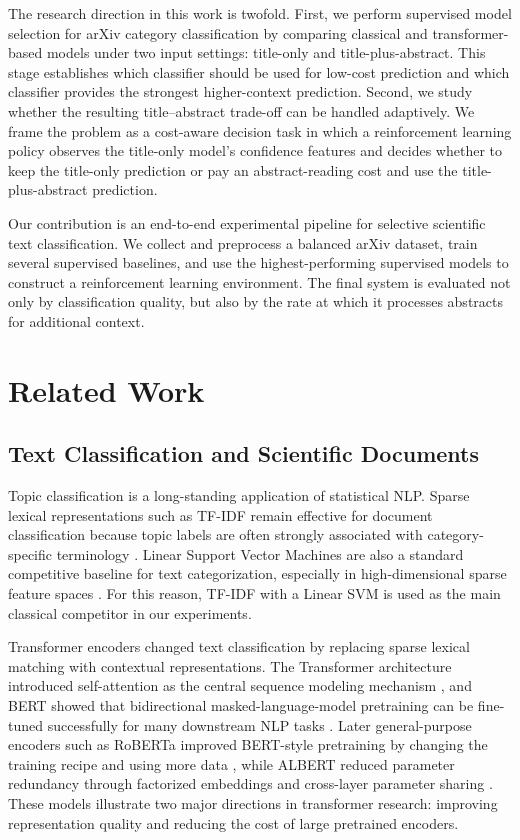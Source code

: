 \documentclass{article}
\begin{document}
The research direction in this work is twofold. First, we perform supervised model selection for arXiv category classification by comparing classical and transformer-based models under two input settings: title-only and title-plus-abstract. This stage establishes which classifier should be used for low-cost prediction and which classifier provides the strongest higher-context prediction. Second, we study whether the resulting title--abstract trade-off can be handled adaptively. We frame the problem as a cost-aware decision task in which a reinforcement learning policy observes the title-only model's confidence features and decides whether to keep the title-only prediction or pay an abstract-reading cost and use the title-plus-abstract prediction.

Our contribution is an end-to-end experimental pipeline for selective scientific text classification. We collect and preprocess a balanced arXiv dataset, train several supervised baselines, and use the highest-performing supervised models to construct a reinforcement learning environment. The final system is evaluated not only by classification quality, but also by the rate at which it processes abstracts for additional context.

\section{Related Work}

\subsection{Text Classification and Scientific Documents}

Topic classification is a long-standing application of statistical NLP. Sparse lexical representations such as TF-IDF remain effective for document classification because topic labels are often strongly associated with category-specific terminology \cite{salton1988term}. Linear Support Vector Machines are also a standard competitive baseline for text categorization, especially in high-dimensional sparse feature spaces \cite{cortes1995support,joachims1998text}. For this reason, TF-IDF with a Linear SVM is used as the main classical competitor in our experiments.

Transformer encoders changed text classification by replacing sparse lexical matching with contextual representations. The Transformer architecture introduced self-attention as the central sequence modeling mechanism \cite{vaswani2017attention}, and BERT showed that bidirectional masked-language-model pretraining can be fine-tuned successfully for many downstream NLP tasks \cite{devlin2019bert}. Later general-purpose encoders such as RoBERTa improved BERT-style pretraining by changing the training recipe and using more data \cite{liu2019roberta}, while ALBERT reduced parameter redundancy through factorized embeddings and cross-layer parameter sharing \cite{lan2020albert}. These models illustrate two major directions in transformer research: improving representation quality and reducing the cost of large pretrained encoders.
\end{document}
